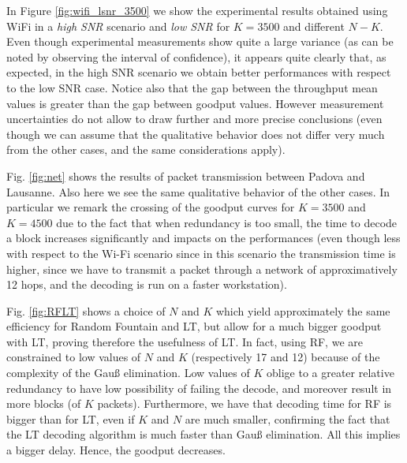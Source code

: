In Figure \ref{fig:wifi_lsnr_3500} we show the experimental results obtained using WiFi in a \textit{high SNR} scenario and \textit{low SNR} for $K=3500$ and different $N-K$. Even though experimental measurements show quite a large variance (as can be noted by observing the interval of confidence), it appears quite clearly that, as expected, in the high SNR scenario we obtain better performances with respect to the low SNR case. Notice also that the gap between the throughput mean values is greater than the gap between goodput values. However measurement uncertainties do not allow to draw further and more precise conclusions (even though we can assume that the qualitative behavior does not differ very much from the other cases, and the same considerations apply).

Fig. \ref{fig:net} shows the results of packet transmission between Padova and Lausanne. Also here we see the same qualitative behavior of the other cases. In particular we remark the crossing of the goodput curves for $K=3500$ and $K=4500$ due to the fact that when redundancy is too small, the time to decode a block increases significantly and impacts on the performances (even though less with respect to the Wi-Fi scenario since in this scenario the transmission time is higher, since we have to transmit a packet through a network of approximatively 12 hops, and the decoding is run on a faster workstation).


Fig. \ref{fig:RFLT} shows a choice of $N$ and $K$ which yield approximately the same efficiency for Random Fountain and LT, but allow for a much bigger goodput with LT, proving therefore the usefulness of LT. In fact, using RF, we are constrained to low values of $N$ and $K$ (respectively 17 and 12) because of the complexity of the Gau{\ss} elimination. Low values of $K$ oblige to a greater relative redundancy to have low possibility of failing the decode, and moreover result in more blocks (of $K$ packets). Furthermore, we have that decoding time for RF is bigger than for LT, even if $K$ and $N$ are much smaller, confirming the fact that the LT decoding algorithm is much faster than Gau{\ss} elimination. All this implies a bigger delay. Hence, the goodput decreases.
